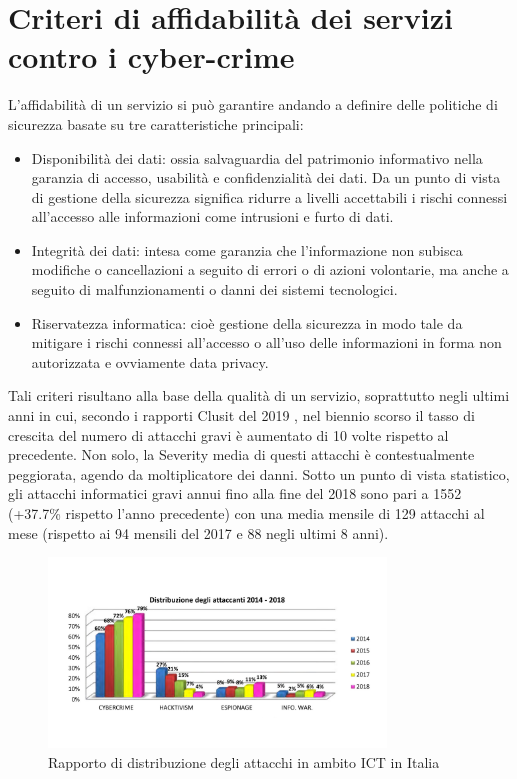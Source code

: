 \section{Criteri di affidabilità dei servizi contro i cyber-crime}
L'affidabilità di un servizio si può garantire andando a definire delle politiche di sicurezza basate su tre caratteristiche principali:
\begin{itemize}
    \item Disponibilità dei dati: ossia salvaguardia del patrimonio informativo nella garanzia di accesso, usabilità e confidenzialità dei dati. Da un punto di vista di gestione della sicurezza significa ridurre a livelli accettabili i rischi connessi all’accesso alle informazioni come intrusioni e furto di dati.
    \item Integrità dei dati: intesa come garanzia che l’informazione non subisca modifiche o cancellazioni a seguito di errori o di azioni volontarie, ma anche a seguito di malfunzionamenti o danni dei sistemi tecnologici.
    \item Riservatezza informatica: cioè gestione della sicurezza in modo tale da mitigare i rischi connessi all’accesso o all’uso delle informazioni in forma non autorizzata e ovviamente data privacy.
\end{itemize}

Tali criteri risultano alla base della qualità di un servizio, soprattutto negli ultimi anni in cui, secondo i rapporti Clusit del 2019 , nel biennio scorso il tasso di crescita del numero di attacchi gravi è aumentato di 10 volte rispetto al precedente. Non solo, la Severity media di questi attacchi è contestualmente peggiorata, agendo da moltiplicatore dei danni. Sotto un punto di vista statistico, gli attacchi informatici gravi annui fino alla fine del 2018 sono pari a 1552 (+37.7\% rispetto l'anno precedente) con una media mensile di 129 attacchi al mese (rispetto ai 94 mensili del 2017 e 88 negli ultimi 8 anni).

\begin{figure}[h]
    \centering
    \includegraphics[width=0.8\textwidth]{img/clusit.jpg}
    \caption{Rapporto di distribuzione degli attacchi in ambito ICT in Italia}
    \label{fig:clusit}
\end{figure}

